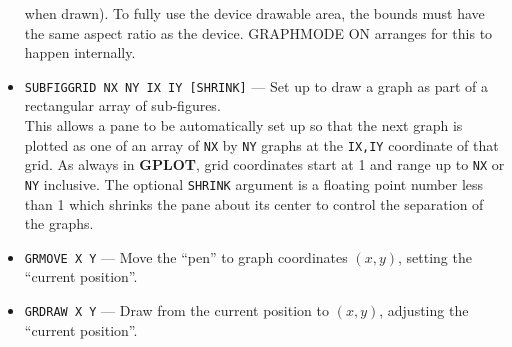 \documentclass[a4paper,twoside,11pt]{article}
\newcommand{\textttc}[1]{\texttt{\textcolor{OurRed}{#1}}}
\begin{document}
\begin{itemize}
   when drawn). To fully use the device drawable area, the bounds must have the same aspect ratio as the device.
   GRAPHMODE ON arranges for this to happen internally.
 \item \textttc{SUBFIGGRID NX NY IX IY [SHRINK]} --- Set up to draw a graph as part of a rectangular array of sub-figures.\\
   This allows a pane to be automatically set up so that the next graph is plotted as one of an array
   of \texttt{NX} by \texttt{NY} graphs at
   the \texttt{IX,IY} coordinate of that grid. As always in \textbf{GPLOT},
   grid coordinates start at 1 and range up to \texttt{NX} or \texttt{NY} inclusive.
   The optional \texttt{SHRINK} argument is a floating
   point number less than 1 which shrinks the pane about its center to control the separation of the graphs.
 \item \textttc{GRMOVE X Y} --- Move the ``pen'' to graph coordinates $(x,y)$, setting the ``current position''.
 \item \textttc{GRDRAW X Y} --- Draw from the current position to $(x,y)$, adjusting the ``current position''.
\end{itemize}
\end{document}
